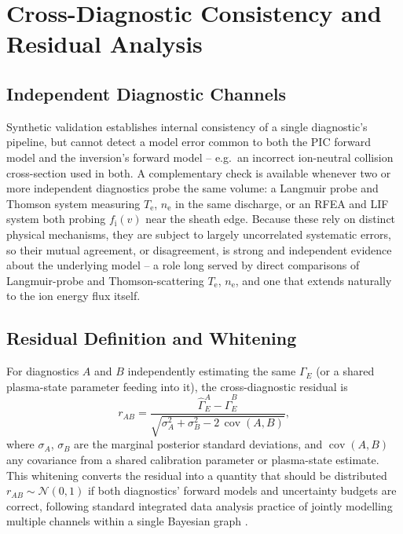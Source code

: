 \section{Cross-Diagnostic Consistency and Residual Analysis}
\label{sec:cross-diagnostic}

\subsection{Independent Diagnostic Channels}
\label{subsec:independent-channels}

Synthetic validation establishes internal consistency of a single diagnostic's pipeline, but cannot detect a model error common to both the PIC forward model and the inversion's forward model -- e.g.\ an incorrect ion-neutral collision cross-section used in both. A complementary check is available whenever two or more independent diagnostics probe the same volume: a Langmuir probe and Thomson system measuring $T_{\mathrm{e}}$, $n_{\mathrm{e}}$ in the same discharge, or an RFEA and LIF system both probing $f_{\mathrm{i}}(v)$ near the sheath edge. Because these rely on distinct physical mechanisms, they are subject to largely uncorrelated systematic errors, so their mutual agreement, or disagreement, is strong and independent evidence about the underlying model -- a role long served by direct comparisons of Langmuir-probe and Thomson-scattering $T_{\mathrm{e}}$, $n_{\mathrm{e}}$, and one that extends naturally to the ion energy flux itself.

\subsection{Residual Definition and Whitening}
\label{subsec:residual-def}

For diagnostics $A$ and $B$ independently estimating the same $\Gamma_{E}$ (or a shared plasma-state parameter feeding into it), the cross-diagnostic residual is
\begin{equation}
r_{AB} = \frac{\hat{\Gamma}_{E}^{A} - \hat{\Gamma}_{E}^{B}}{\sqrt{\sigma_{A}^{2} + \sigma_{B}^{2} - 2\,\operatorname{cov}(A,B)}},
\label{eq:cross-residual}
\end{equation}
where $\sigma_{A}$, $\sigma_{B}$ are the marginal posterior standard deviations, and $\operatorname{cov}(A,B)$ any covariance from a shared calibration parameter or plasma-state estimate. This whitening converts the residual into a quantity that should be distributed $r_{AB} \sim \mathcal{N}(0,1)$ if both diagnostics' forward models and uncertainty budgets are correct, following standard integrated data analysis practice of jointly modelling multiple channels within a single Bayesian graph \cite{ref0713,ref0683}.

